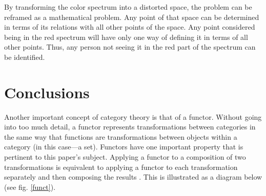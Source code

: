 \documentclass{article}
\begin{document}
By transforming the color spectrum into a distorted space, the problem can be reframed as
a mathematical problem. Any point of that space can be determined in terms of its relations with
all other points of the space. Any point considered being in the red spectrum will have only one
way of defining it in terms of all other points. Thus, any person not seeing it in the red part of the
spectrum can be identified.

\section*{Conclusions}

Another important concept of category theory is that of a functor. Without going into too
much detail, a functor represents transformations between categories in the same way that
functions are transformations between objects within a category (in this case---a set). Functors
have one important property that is pertinent to this paper’s subject. Applying a functor to a
composition of two transformations is equivalent to applying a functor to each transformation
separately and then composing the results \cite{Ahrens}. This is illustrated as a diagram below (see fig. \ref{funct}).
\end{document}
